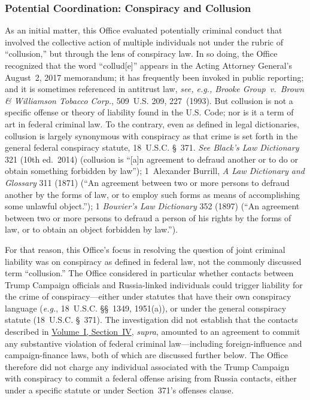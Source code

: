 \subsubsection{Potential Coordination: Conspiracy and Collusion}
As an initial matter, this Office evaluated potentially criminal conduct that involved the collective action of multiple individuals not under the rubric of ``collusion,'' but through the lens of conspiracy law.
In so doing, the Office recognized that the word ``collud[e]'' appears in the Acting Attorney General's August~2, 2017 memorandum; it has frequently been invoked in public reporting; and it is sometimes referenced in antitrust law, \textit{see, e.g., Brooke Group~v.\ Brown \& Williamson Tobacco Corp.}, 509~U.S. 209, 227~(1993).
But collusion is not a specific offense or theory of liability found in the U.S. Code; nor is it a term of art in federal criminal law.
To the contrary, even as defined in legal dictionaries, collusion is largely synonymous with conspiracy as that crime is set forth in the general federal conspiracy statute, 18~U.S.C. \S~371.
\textit{See Black's Law Dictionary} 321 (10th ed.~2014) (collusion is ``[a]n agreement to defraud another or to do or obtain something forbidden by law''); 1~Alexander Burrill, \textit{A Law Dictionary and Glossary} 311 (1871) (``An agreement between two or more persons to defraud another by the forms of law, or to employ such forms as means of accomplishing some unlawful object.''); 1 \textit{Bouvier's Law Dictionary} 352 (1897) (``An agreement between two or more persons to defraud a person of his rights by the forms of law, or to obtain an object forbidden by law.'').

For that reason, this Office's focus in resolving the question of joint criminal liability was on conspiracy as defined in federal law, not the commonly discussed term ``collusion.''
The Office considered in particular whether contacts between Trump Campaign officials and Russia-linked individuals could trigger liability for the crime of conspiracy---either under statutes that have their own conspiracy language (\textit{e.g.}, 18~U.S.C. \S\S~1349, 1951(a)), or under the general conspiracy statute (18~U.S.C. \S~371).
The investigation did not establish that the contacts described in \hyperlink{section.1.4}{Volume~I, Section~IV}, \textit{supra}, amounted to an agreement to commit any substantive violation of federal criminal law---including foreign-influence and campaign-finance laws, both of which are discussed further below.
The Office therefore did not charge any individual associated with the Trump Campaign with conspiracy to commit a federal offense arising from Russia contacts, either under a specific statute or under Section~371's offenses clause.

